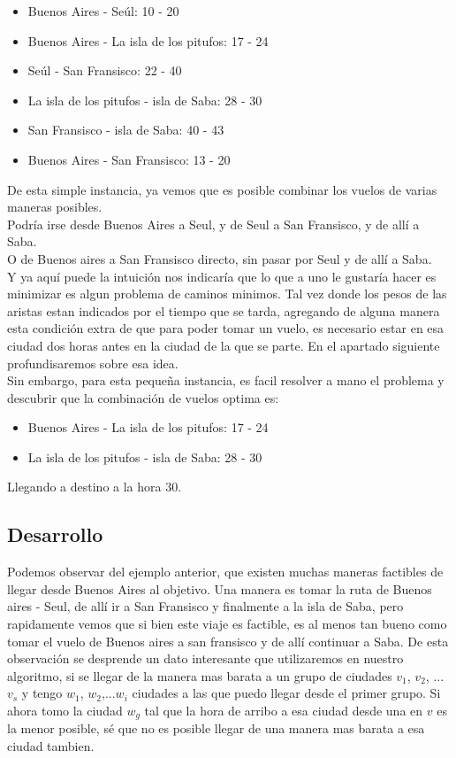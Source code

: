 \begin{itemize}
\item Buenos Aires - Seúl: 10 - 20
\item Buenos Aires - La isla de los pitufos: 17 - 24
\item Seúl - San Fransisco: 22 - 40
\item La isla de los pitufos - isla de Saba: 28 - 30
\item San Fransisco - isla de Saba: 40 - 43
\item Buenos Aires - San Fransisco: 13 - 20
\end{itemize}

De esta simple instancia, ya vemos que es posible combinar los vuelos de varias maneras posibles.
\\
Podría irse desde Buenos Aires a Seul, y de Seul a San Fransisco, y de allí a Saba.
\\
O de Buenos aires a San Fransisco directo, sin pasar por Seul y de allí a Saba.
\\
Y ya aquí puede la intuición nos indicaría que lo que a uno le gustaría hacer es minimizar es algun problema de caminos minimos. Tal vez donde los pesos de las aristas estan indicados por el tiempo que se tarda, agregando de alguna manera esta condición extra de que para poder tomar un vuelo, es necesario estar en esa ciudad dos horas antes en la ciudad de la que se parte. En el apartado siguiente profundisaremos sobre esa idea.
\\
Sin embargo, para esta pequeña instancia, es facil resolver a mano el problema y descubrir que la combinación de vuelos optima es:

\begin{itemize}
\item Buenos Aires - La isla de los pitufos: 17 - 24
\item La isla de los pitufos - isla de Saba: 28 - 30
\end{itemize}

Llegando a destino a la hora $30$.

\subsection{Desarrollo}

Podemos observar del ejemplo anterior, que existen muchas maneras factibles de llegar desde Buenos Aires al objetivo. Una manera es tomar la ruta de Buenos aires - Seul, de allí ir a San Fransisco y finalmente a la isla de Saba, pero rapidamente vemos que si bien este viaje es factible, es al menos tan bueno como tomar el vuelo de Buenos aires a san fransisco y de allí continuar a Saba. De esta observación se desprende un dato interesante que utilizaremos en nuestro algoritmo, si se llegar de la manera mas barata a un grupo de ciudades $v_1$, $v_2$, ... $v_s$ y tengo $w_1$, $w_2$,...$w_i$ ciudades a las que puedo llegar desde el primer grupo. Si ahora tomo la ciudad $w_g$ tal que la hora de arribo a esa ciudad desde una en $v$ es la menor posible, sé que no es posible llegar de una manera mas barata a esa ciudad tambien.

